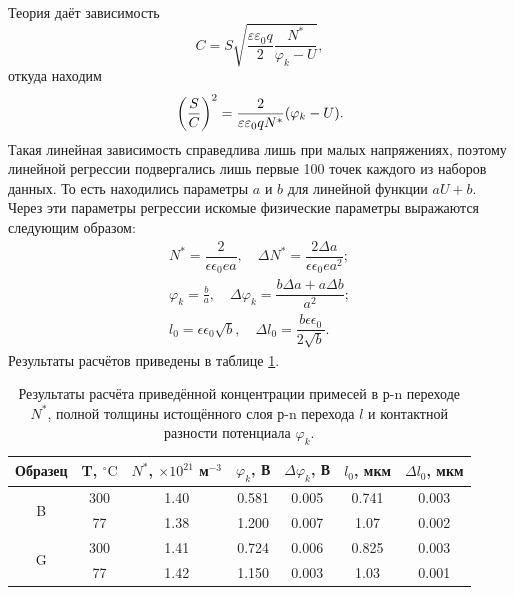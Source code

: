 \documentclass[14pt, russian, a4paper]{extarticle}
\begin{document}
Теория даёт зависимость 
\begin{equation}
	C = S \sqrt{\frac{\varepsilon \varepsilon_0 q}{2} \frac{N^*}{\varphi_k - U}},
\end{equation}
откуда находим
\begin{equation}
	\qty(\frac{S}{C})^2 = \frac{2}{\varepsilon \varepsilon_0 q N^*} (\varphi_k - U).
\end{equation}
Такая линейная зависимость справедлива лишь при малых напряжениях, поэтому линейной регрессии подвергались лишь первые 100 точек каждого из наборов данных. То есть находились параметры $a$ и $b$ для линейной функции $aU+b$. Через эти параметры регрессии искомые физические параметры выражаются следующим образом:
\begin{equation}
 	\begin{split}
 		N^* = \dfrac{2}{\epsilon\epsilon_0 e a},\quad \Delta N^* = \dfrac{2\Delta a}{\epsilon\epsilon_0 e a^2};\\
 		\varphi_k = \frac{b}{a},\quad \Delta \varphi_k = \dfrac{b \Delta a + a \Delta b}{a^2};\\
 		l_0 = \epsilon\epsilon_0\sqrt{b},\quad \Delta l_0 = \dfrac{b \epsilon\epsilon_0}{2 \sqrt{b}}.
 	\end{split}
 \end{equation}
 Результаты расчётов приведены в таблице \ref{tab:2}.

\begin{table}[htbp]
\begin{tabular}{|c|c|c|c|c|c|c|}
\hline
Образец            & T, ${}^\circ\mathrm{C}$ & $N^*$, $\times10^{21}$ м${}^{-3}$ & $\varphi_k$, В & $\Delta\varphi_k$, В & $l_0$, мкм & $\Delta l_0$, мкм \\ \hline
\multirow{2}{*}{B} & 300                     & 1.40                              & 0.581          & 0.005                & 0.741      & 0.003             \\ \cline{2-7} 
                   & 77                      & 1.38                              & 1.200          & 0.007                & 1.07       & 0.002             \\ \hline
\multirow{2}{*}{G} & 300                     & 1.41                              & 0.724          & 0.006                & 0.825      & 0.003             \\ \cline{2-7} 
                   & 77                      & 1.42                              & 1.150          & 0.003                & 1.03       & 0.001             \\ \hline
\end{tabular}
\caption{Результаты расчёта приведённой концентрации примесей в р-n переходе $N^*$, полной толщины истощённого слоя р-n перехода $l$ и контактной разности потенциала $\varphi_k$.}
\label{tab:2}
\end{table}
\end{document}
